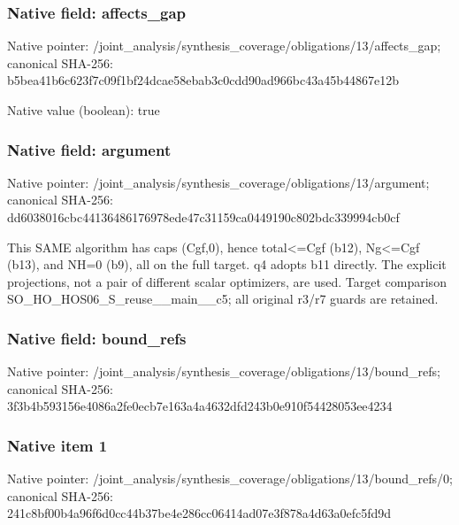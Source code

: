 \documentclass[10pt,a4paper]{article}
\begin{document}
\subsubsection{Native field: affects\_\allowbreak{}gap}
Native pointer: /joint\_\allowbreak{}analysis/synthesis\_\allowbreak{}coverage/obligations/13/affects\_\allowbreak{}gap; canonical SHA-256: b5bea41b6c623f7c09f1bf24dcae58ebab3c0cdd90ad966bc43a45b44867e12b

Native value (boolean): true

\subsubsection{Native field: argument}
Native pointer: /joint\_\allowbreak{}analysis/synthesis\_\allowbreak{}coverage/obligations/13/argument; canonical SHA-256: dd6038016cbc44136486176978ede47c31159ca0449190c802bdc339994cb0cf

\begingroup\raggedright\sloppy This SAME algorithm has caps (Cgf,\allowbreak{}0),\allowbreak{} hence total<=\allowbreak{}Cgf (b12),\allowbreak{} Ng<=\allowbreak{}Cgf (b13),\allowbreak{} and NH=\allowbreak{}0 (b9),\allowbreak{} all on the full target. q4 adopts b11 directly. The explicit projections,\allowbreak{} not a pair of different scalar optimizers,\allowbreak{} are used. Target comparison SO\_\allowbreak{}HO\_\allowbreak{}HOS06\_\allowbreak{}S\_\allowbreak{}reuse\_\allowbreak{}\_\allowbreak{}main\_\allowbreak{}\_\allowbreak{}c5;\allowbreak{} all original r3/\allowbreak{}r7 guards are retained.\par\endgroup

\subsubsection{Native field: bound\_\allowbreak{}refs}
Native pointer: /joint\_\allowbreak{}analysis/synthesis\_\allowbreak{}coverage/obligations/13/bound\_\allowbreak{}refs; canonical SHA-256: 3f3b4b593156e4086a2fe0ecb7e163a4a4632dfd243b0e910f54428053ee4234

\subsubsection{Native item 1}
Native pointer: /joint\_\allowbreak{}analysis/synthesis\_\allowbreak{}coverage/obligations/13/bound\_\allowbreak{}refs/0; canonical SHA-256: 241c8bf00b4a96f6d0cc44b37be4e286cc06414ad07e3f878a4d63a0efc5fd9d
\end{document}
